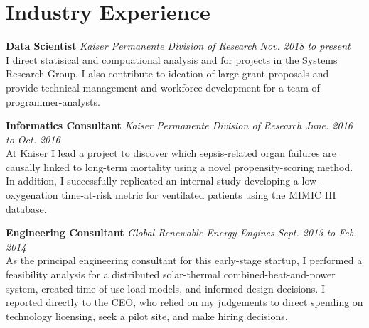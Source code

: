 \section{\mysidestyle Industry Experience}

	\textbf{Data Scientist} 
	\textsl{Kaiser Permanente Division of Research}	 
	\hfill \textsl{Nov. 2018 to present} \\ 
    {\small I direct statisical and compuational analysis and for projects in the Systems Research Group. I also contribute to ideation of large grant proposals and provide technical management and workforce development for a team of programmer-analysts.}
    
	\textbf{Informatics Consultant} 
	\textsl{Kaiser Permanente Division of Research}	 
	\hfill \textsl{June. 2016 to Oct. 2016} \\ 
    {\small At Kaiser I lead a project to discover which sepsis-related organ failures are causally linked to long-term mortality using a novel propensity-scoring method. In addition, I successfully replicated an internal study developing a low-oxygenation time-at-risk metric for ventilated patients using the MIMIC III database.}
    
       \textbf{Engineering Consultant} 
       \textsl{Global Renewable Energy Engines}        
       \hfill \textsl{Sept. 2013 to Feb. 2014} \\ 
    {\small As the principal engineering consultant for this early-stage startup, I performed a feasibility analysis for a distributed solar-thermal combined-heat-and-power system, created time-of-use load models, and informed design decisions. I reported directly to the CEO, who relied on my judgements to direct spending on technology licensing, seek a pilot site, and make hiring decisions.}
